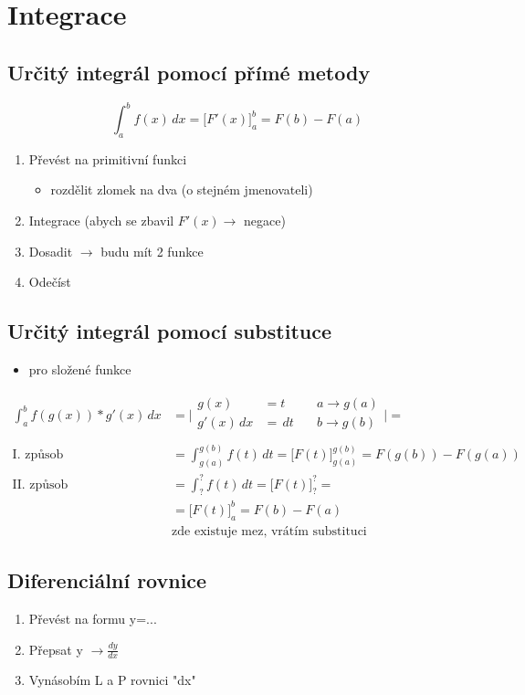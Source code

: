 \section{Integrace}
\subsection{Určitý integrál pomocí přímé metody}
\begin{equation}
\int_{a}^{b}f(x)\,dx = \Bigr[ F'(x) \Bigr]_a^b=F(b)-F(a)
\end{equation}

\begin{enumerate}
  \item Převést na primitivní funkci
    \begin{itemize}
      \item rozdělit zlomek na dva (o stejném jmenovateli)
    \end{itemize}
  \item Integrace (abych se zbavil $F'(x)\rightarrow$ negace)
  \item Dosadit $\rightarrow$ budu mít 2 funkce
  \item Odečíst
\end{enumerate}

\subsection{Určitý integrál pomocí substituce}
\begin{itemize}\item pro složené funkce\end{itemize}
\begin{align*}
  \int_a^bf(g(x))*g'(x)\,dx&=
  \Biggr|
    \begin{alignedat}{2}
      g(x) &=t \quad &a \rightarrow g(a) \\
      g'(x)\,dx &=\,dt \quad &b \rightarrow g(b) \\
    \end{alignedat}
  \Biggr| = \\
  \text{I. způsob} &= \int_{g(a)}^{g(b)}f(t)\,dt = \Bigr[F(t)\Bigr]_{g(a)}^{g(b)} = F(g(b))-F(g(a)) \\
  \text{II. způsob} &= \int_?^?f(t)\,dt=\Bigr[F(t)\Bigr]_?^? = \\
  &=\Bigr[F(t)\Bigr]_a^b = F(b)-F(a) \\
  & \text{zde existuje mez, vrátím substituci}
\end{align*}

\subsection{Diferenciální rovnice}
\begin{enumerate}
  \item Převést na formu y=...
  \item Přepsat y $\rightarrow\frac{dy}{dx}$
  \item Vynásobím L a P rovnici "dx"
\end{enumerate}

